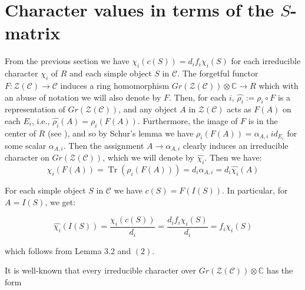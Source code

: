 \documentclass[a4paper,twoside,11pt]{amsart}
\theoremstyle{plain} %
\theoremstyle{definition}
\begin{document}
\section{Character values in terms of the $S$-matrix}
 From the previous section we have $\chi_i(c(S))=d_i f_i  \chi_i (S)$ for each irreducible character $\chi_i$  of $R$ and each simple object $S$ in $\mathcal{C}$. The forgetful functor $F:\mathcal{Z}(\mathcal{C})\rightarrow \mathcal{C}$ induces a ring homomorphism $Gr(\mathcal{Z}(\mathcal{C}))\otimes \mathbb{C}\rightarrow R$ which with an abuse of notation we will also denote by $F$. Then, for each $i$, $\widehat{\rho_i}:=\rho_i \circ F$ is a representation of $Gr(\mathcal{Z}(\mathcal{C}))$, and any object $A$ in $\mathcal{Z}(\mathcal{C})$ acts as $F(A)$ on each $E_i$, i.e., $\widehat{\rho_i}(A)=\rho_i (F(A))$. Furthermore, the image of $F$ is in the center of $R$ (see \cite[Section 7.13]{EGNO}), and so by Schur's lemma we have $\rho_i (F(A))=\alpha_{A,i} ~ id_{E_i}$ for some scalar $\alpha_{A,i}$. Then the assignment $A\rightarrow \alpha_{A,i}$ clearly induces  an irreducible character on $Gr(\mathcal{Z}(\mathcal{C}))$, which we will denote by $\widehat{\chi_i}$. Then we have:
 \begin{equation}
 	\chi_i (F(A))=\operatorname{Tr}(\rho_i (F(A)))=d_i \alpha_{A,i}= d_i \widehat{\chi_i}(A)
 \end{equation}
\medskip



For each simple object $S$ in $\mathcal{C}$ we have $c(S)=F(I(S))$. In particular, for $A=I(S)$, we get:

\begin{equation}
	\widehat{\chi_i}(I(S))=\frac{\chi_i (c(S))}{d_i}=\frac{d_i f_i \chi_i (S)}{d_i}=f_i \chi_i (S)
\end{equation}

which follows from Lemma 3.2 and $(2)$.

\bigskip 


    It is well-known that every irreducible character over  $Gr(\mathcal{Z}(\mathcal{C}))\otimes \mathbb{C}$ has the form 
    
\end{document}

